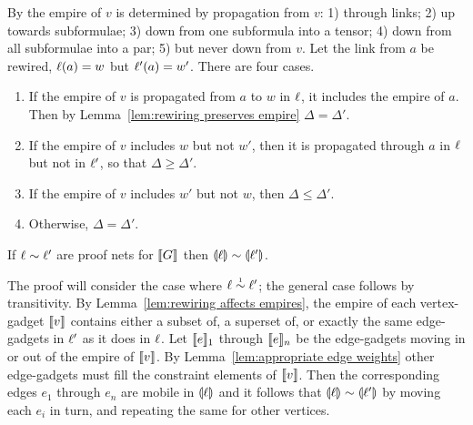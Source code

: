 \documentclass[conference]{IEEEtran}
\begin{document}
\begin{IEEEproof}
By \cite[Proposition 2.b]{Bellin-vandeWiele-1995} the empire of $v$ is determined by propagation from $v$: 1) through links; 2) up towards subformulae; 3) down from one subformula into a tensor; 4) down from all subformulae into a par; 5) but never down from $v$.
%
Let the link from $a$ be rewired, $\ell(a)=w$ but $\ell'(a)=w'$.
%
There are four cases.
%
\begin{enumerate}
	\item
If the empire of $v$ is propagated from $a$ to $w$ in $\ell$, it includes the empire of $a$.
%
Then by Lemma~\ref{lem:rewiring preserves empire} $\Delta=\Delta'$.

	\item
If the empire of $v$ includes $w$ but not $w'$, then it is propagated through $a$ in $\ell$ but not in $\ell'$, so that $\Delta\geq\Delta'$.

	\item
If the empire of $v$ includes $w'$ but not $w$, then $\Delta\leq\Delta'$.

	\item
Otherwise, $\Delta=\Delta'$.
\end{enumerate}
\vskip-12pt
\end{IEEEproof}



\begin{lemma}
\label{lem:soundness}
If $\links\perm\links'$ are proof nets for $\llbracket G\rrbracket$ then $\coitn\links\perm\coitn{\links'}$.
\end{lemma}

\begin{IEEEproof}
The proof will consider the case where $\links\perm*\links'$; the general case follows by transitivity.
%
By Lemma~\ref{lem:rewiring affects empires}, the empire of each vertex-gadget $\llbracket v\rrbracket$ contains either a subset of, a superset of, or exactly the same edge-gadgets in $\ell'$ as it does in $\ell$.
%
Let $\llbracket e\rrbracket_1$ through $\llbracket e\rrbracket_n$ be the edge-gadgets moving in or out of the empire of $\llbracket v\rrbracket$.
%
By Lemma~\ref{lem:appropriate edge weights} other edge-gadgets must fill the constraint elements of $\llbracket v\rrbracket$.
%
Then the corresponding edges $e_1$ through $e_n$ are mobile in $\llparenthesis\ell\rrparenthesis$ and it follows that $\coitn\links\perm\coitn{\links'}$ by moving each $e_i$ in turn, and repeating the same for other vertices.
%
\end{IEEEproof}



\end{document}
